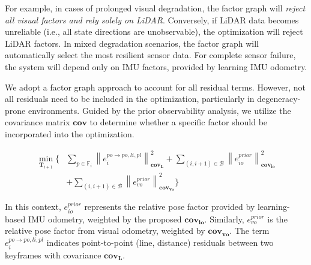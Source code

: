 For example, in cases of prolonged visual degradation, the factor graph will \textit{reject all visual factors and rely solely on LiDAR}. Conversely, if LiDAR data becomes unreliable (i.e., all state directions are unobservable), the optimization will reject LiDAR factors. In mixed degradation scenarios, the factor graph will automatically select the most resilient sensor data. For complete sensor failure, the system will depend only on IMU factors, provided by learning IMU odometry.

We adopt a factor graph approach to account for all residual terms. However, not all residuals need to be included in the optimization, particularly in degeneracy-prone environments. Guided by the prior observability analysis, we utilize the covariance matrix $\mathbf{cov}$  to determine whether a specific factor should be incorporated into the optimization.



\begin{equation}
\begin{aligned}
\min_{\mathbf{T}_{i+1}} \bigg\{ 
& \sum_{p \in \mathbb{F}_i} \left\| e_i^{po \to po,li,pl} \right\|_{\mathbf{cov_L}}^2 
+ \sum_{(i, i+1) \in \mathcal{B}} \left\| e_{io}^{prior} \right\|_{\mathbf{cov_{io}}}^2 \\
& + \sum_{(i, i+1) \in \mathcal{B}} \left\| e_{vo}^{prior} \right\|_{\mathbf{cov_{vo}}}^2 
\bigg\}
\end{aligned}
\end{equation}







In this context, \( e^{prior}_{io} \) represents the relative pose factor provided by learning-based IMU odometry, weighted by the proposed \( \mathbf{cov_{io}} \). Similarly, \( e^{prior}_{vo} \) is the relative pose factor from visual odometry, weighted by \( \mathbf{cov_{vo}} \). The term \( e_i^{po \to po,li,pl} \) indicates point-to-point (line, distance) residuals between two keyframes with covariance \( \mathbf{cov_{L}} \)\cite{zhao2021super}. 


